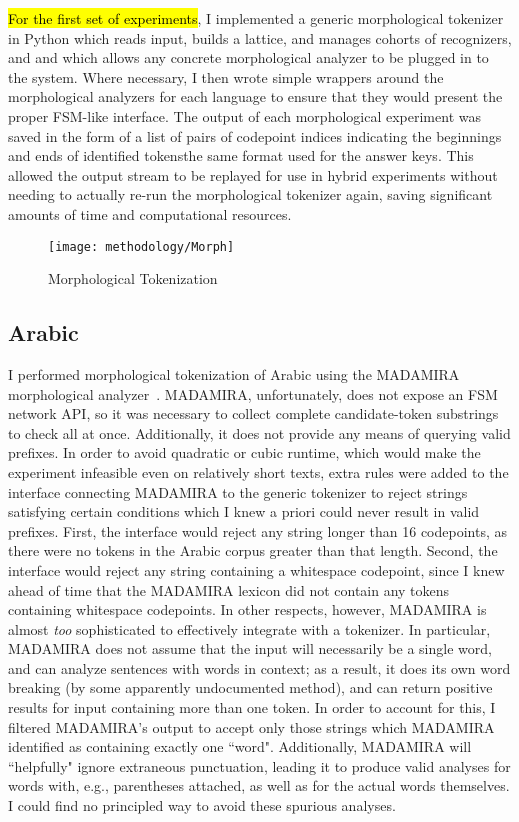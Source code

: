 \hl{For the first set of experiments}, I implemented a generic morphological tokenizer in Python which reads input, builds a lattice, and manages cohorts of recognizers, and and which allows any concrete morphological analyzer to be plugged in to the system. Where necessary, I then wrote simple wrappers around the morphological analyzers for each language to ensure that they would present the proper FSM-like interface.
The output of each morphological experiment was saved in the form of a list of pairs of codepoint indices indicating the beginnings and ends of identified tokens\textemdash the same format used for the answer keys. This allowed the output stream to be replayed for use in hybrid experiments without needing to actually re-run the morphological tokenizer again, saving significant amounts of time and computational resources.

\begin{figure}
	\texttt{[image: methodology/Morph]}
	\caption{Morphological Tokenization}
	\label{morphdiagram}
\end{figure}

\subsection{Arabic}
I performed morphological tokenization of Arabic using the MADAMIRA morphological analyzer~\cite{pasha14}. MADAMIRA, unfortunately, does not expose an FSM network API, so it was necessary to collect complete candidate-token substrings to check all at once. Additionally, it does not provide any means of querying valid prefixes. In order to avoid quadratic or cubic runtime, which would make the experiment infeasible even on relatively short texts, extra rules were added to the interface connecting MADAMIRA to the generic tokenizer to reject strings satisfying certain conditions which I knew a priori could never result in valid prefixes. First, the interface would reject any string longer than 16 codepoints, as there were no tokens in the Arabic corpus greater than that length. Second, the interface would reject any string containing a whitespace codepoint, since I knew ahead of time that the MADAMIRA lexicon did not contain any tokens containing whitespace codepoints.
In other respects, however, MADAMIRA is almost \textit{too} sophisticated to effectively integrate with a tokenizer. In particular, MADAMIRA does not assume that the input will necessarily be a single word, and can analyze sentences with words in context; as a result, it does its own word breaking (by some apparently undocumented method), and can return positive results for input containing more than one token. In order to account for this, I filtered MADAMIRA's output to accept only those strings which MADAMIRA identified as containing exactly one ``word". Additionally, MADAMIRA will ``helpfully" ignore extraneous punctuation, leading it to produce valid analyses for words with, e.g., parentheses attached, as well as for the actual words themselves. I could find no principled way to avoid these spurious analyses.

